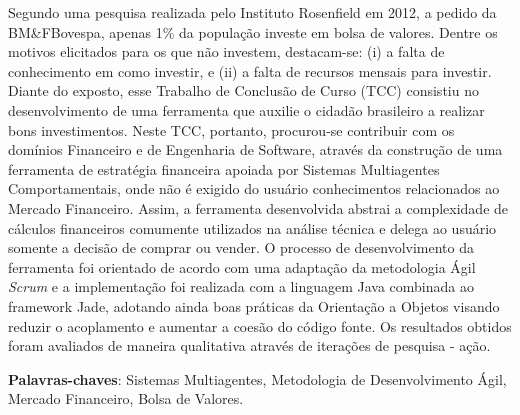\begin{resumo}[Resumo]
 


 \vspace{\onelineskip}
    Segundo uma pesquisa realizada pelo Instituto Rosenfield em 2012, a pedido da  BM\&FBovespa, apenas 1\% da população investe em bolsa de valores. Dentre os motivos elicitados para os que não investem, destacam-se: (i) a falta de conhecimento em como investir, e (ii) a falta de recursos mensais para investir. Diante do exposto, esse Trabalho de Conclusão de Curso (TCC) consistiu no desenvolvimento de uma ferramenta que auxilie o cidadão brasileiro a realizar bons investimentos. Neste TCC, portanto, procurou-se contribuir com os domínios Financeiro e de Engenharia de Software, através da construção de uma ferramenta de estratégia financeira apoiada por Sistemas Multiagentes Comportamentais, onde não é exigido do usuário conhecimentos relacionados ao Mercado Financeiro. Assim, a ferramenta desenvolvida abstrai a complexidade de cálculos financeiros comumente utilizados na análise técnica e delega ao usuário somente a decisão de comprar ou vender. O processo de desenvolvimento da ferramenta foi orientado de acordo com uma adaptação da metodologia Ágil \textit{Scrum} e a implementação foi realizada com a linguagem Java combinada ao framework Jade, adotando ainda boas práticas da Orientação a Objetos visando reduzir o acoplamento e aumentar a coesão do código fonte. Os resultados obtidos foram avaliados de maneira qualitativa através de iterações de pesquisa - ação.

    

 \noindent

 \textbf{Palavras-chaves}: Sistemas Multiagentes, Metodologia de Desenvolvimento Ágil, Mercado Financeiro, Bolsa de Valores.
\end{resumo}
